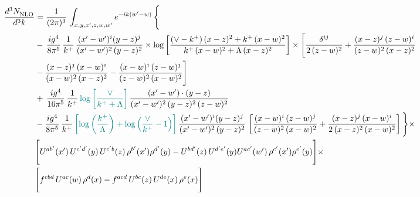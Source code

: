 \documentclass[9pt]{article}
\numberwithin{equation}{section}
\begin{document}
\begin{align}
     \frac{d^{3}N_{\rm NLO}^{\rm}}{d^{3}k}  & =  \frac{1}{(2\pi)^{3}}\, \int_{x,y,x',z,w,w^{\prime}} e^{-ik(w^{\prime}-w)}\, \Bigg\{\notag \\ & -\,\frac{ig^{4}}{8\pi^{5}}\,\frac{1}{k^{+}}\,\frac{(x'-w')^{i}(y-z)^{j}}{(x'-w')^{2}\,(y-z)^{2}}\times \log{\left[\frac{(\vee-k^{+})\,(x-z)^{2}+k^{+}\,(x-w)^{2}}{k^{+}\,(x-w)^{2}+\Lambda\, (x-z)^{2}}\right]}\times \Bigg[\frac{\delta^{ij}}{2\,(z-w)^{2}}+\frac{(x-z)^{j}\,(z-w)^{i}}{(z-w)^{2}\,(x-z)^{2}}\notag \\ & -\frac{(x-z)^{j}\,(x-w)^{i}}{(x-w)^{2}\,(x-z)^{2}}-\frac{(x-w)^{i}\,(z-w)^{j}}{(z-w)^{2}\,(x-w)^{2}}\Bigg]\notag \\ & +\,\frac{ig^{4}}{16\pi^{5}}\,\frac{1}{k^{+}}\,{\color{teal}\log{\left[\frac{\vee}{k^{+}+\Lambda}\right]}}\, \frac{(x'-w')\cdot (y-z)}{(x'-w')^{2}\,(y-z)^{2}\,(z-w)^{2}}\notag \\ & -\frac{ig^{4}}{8\pi^{5}}\,\frac{1}{k^{+}}\,{\color{teal}\left[\log{\left(\frac{k^{+}}{\Lambda}\right)}+\log{\left(\frac{\vee}{k^{+}}-1\right)}\right]}\,\frac{(x'-w')^{i}(y-z)^{j}}{(x'-w')^{2}\,(y-z)^{2}}\,\left[\frac{(x-w)^{i}\,(z-w)^{j}}{(z-w)^{2}\,(x-w)^{2}}+\frac{(x-z)^{j}\,(x-w)^{i}}{2\,(x-z)^{2}\, (x-w)^{2}}\right]\Bigg\}\times \notag \\ &  \Bigg[U^{ab'}(x')\,U^{c'd'}(y)\,U^{c'b}(z)\,\rho^{b'}(x')\rho^{d'}(y)-U^{bd'}(z)\,U^{d'e'}(y)U^{ac'}(w')\,\rho^{c'}(x')\rho^{e'}(y)\Bigg]\times\notag \\ & \Bigg[f^{cbd}\,U^{ac}(w)\,\rho^{d}(x)-f^{acd}\, U^{bc}(z)\,U^{de}(x)\,\rho^{e}(x)\Bigg] 
\end{align}
\end{document}
